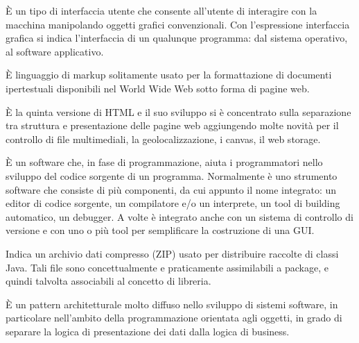 \begin{acronym}[HTML5]
	
	{\small È un tipo di interfaccia utente che consente all'utente di interagire con la macchina manipolando oggetti grafici convenzionali. Con l'espressione interfaccia grafica si indica l'interfaccia di un qualunque programma: dal sistema operativo, al software applicativo. \par}
	
	
	{\small È linguaggio di markup solitamente usato per la formattazione di documenti ipertestuali disponibili nel World Wide Web sotto forma di pagine web. \par}
	
	
	{\small È la quinta versione di HTML e il suo sviluppo si è concentrato sulla separazione tra struttura e presentazione delle pagine web aggiungendo molte novità per il controllo di file multimediali, la geolocalizzazione, i canvas, il web storage. \par}

	
	{\small È un software che, in fase di programmazione, aiuta i programmatori nello sviluppo del codice sorgente di un programma. Normalmente è uno strumento software che consiste di più componenti, da cui appunto il nome integrato: un editor di codice sorgente, un compilatore e/o un interprete, un tool di building automatico, un debugger. A volte è integrato anche con un sistema di controllo di versione e con uno o più tool per semplificare la costruzione di una GUI. \par}
	
	
	{\small Indica un archivio dati compresso (ZIP) usato per distribuire raccolte di classi Java. Tali file sono concettualmente e praticamente assimilabili a package, e quindi talvolta associabili al concetto di libreria. \par}	
	
	
	{\small È un pattern architetturale molto diffuso nello sviluppo di sistemi software, in particolare nell'ambito della programmazione orientata agli oggetti, in grado di separare la logica di presentazione dei dati dalla logica di business. \par}
	

\end{acronym}
